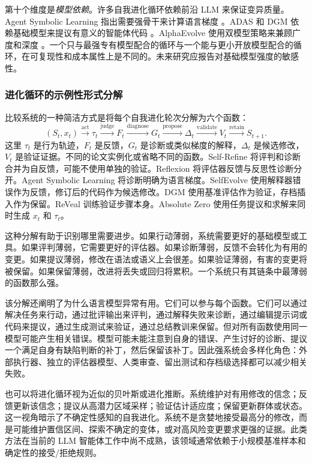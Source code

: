 第十个维度是\emph{模型依赖}。许多自我进化循环依赖前沿 LLM 来保证变异质量。Agent Symbolic Learning 指出需要强骨干来计算语言梯度 \cite{agentsymboliclearning2024}。ADAS 和 DGM 依赖基础模型来提议有意义的智能体代码 \cite{adas2025,darwingodelmachine2025}。AlphaEvolve 使用双模型策略来兼顾广度和深度 \cite{alphaevolve2025}。一个只与最强专有模型配合的循环与一个能与更小开放模型配合的循环，在可复现性和成本属性上是不同的。未来研究应报告对基础模型强度的敏感性。

\subsubsection{进化循环的示例性形式分解}

比较系统的一种简洁方式是将每个自我进化轮次分解为六个函数：
\begin{equation}
(S_t, x_t) \xrightarrow{\mathrm{act}} \tau_t \xrightarrow{\mathrm{judge}} F_t \xrightarrow{\mathrm{diagnose}} G_t \xrightarrow{\mathrm{propose}} \Delta_t \xrightarrow{\mathrm{validate}} V_t \xrightarrow{\mathrm{retain}} S_{t+1}.
\end{equation}
这里 $\tau_t$ 是行为轨迹，$F_t$ 是反馈，$G_t$ 是诊断或类似梯度的解释，$\Delta_t$ 是候选修改，$V_t$ 是验证证据。不同的论文实例化或省略不同的函数。Self-Refine 将评判和诊断合并为自反馈，可能不使用单独的验证。Reflexion 将评估器反馈与反思性诊断分开。Agent Symbolic Learning 将诊断明确为语言梯度。SelfEvolve 使用解释器错误作为反馈，修订后的代码作为候选修改。DGM 使用基准评估作为验证，存档插入作为保留。ReVeal 训练验证步骤本身。Absolute Zero 使用任务提议和求解来同时生成 $x_t$ 和 $\tau_t$。

这种分解有助于识别哪里需要进步。如果行动薄弱，系统需要更好的基础模型或工具。如果评判薄弱，它需要更好的评估器。如果诊断薄弱，反馈不会转化为有用的变更。如果提议薄弱，修改在语法或语义上会很差。如果验证薄弱，有害的变更将被保留。如果保留薄弱，改进将丢失或回归将累积。一个系统只有其链条中最薄弱的函数那么强。

该分解还阐明了为什么语言模型异常有用。它们可以参与每个函数。它们可以通过解决任务来行动，通过批评输出来评判，通过解释失败来诊断，通过编辑提示词或代码来提议，通过生成测试来验证，通过总结教训来保留。但对所有函数使用同一模型可能产生相关错误。模型可能未能注意到自身的错误、产生讨好的诊断、提议一个满足自身有缺陷判断的补丁，然后保留该补丁。因此强系统会多样化角色：外部执行器、独立的评估器模型、人类审查、留出测试和存档级选择都可以减少相关失败。

也可以将进化循环视为近似的贝叶斯或进化推断。系统维护对有用修改的信念；反馈更新该信念；提议从高潜力区域采样；验证估计适应度；保留更新群体或状态。这一视角暗示了不确定性感知的自我进化。系统不是贪婪地接受最高分的修改，而是可能维护置信区间、探索不确定的变体，或对高风险变更要求更强的证据。此类方法在当前的 LLM 智能体工作中尚不成熟，该领域通常依赖于小规模基准样本和确定性的接受/拒绝规则。

